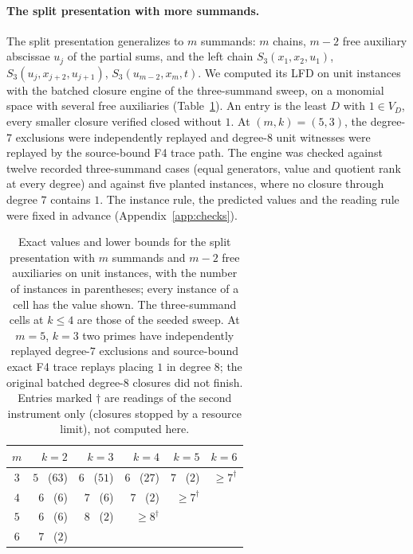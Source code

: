 \documentclass[11pt]{article}
\theoremstyle{definition}\newtheorem{definition}[theorem]{Definition}
\theoremstyle{remark}\newtheorem{remark}[theorem]{Remark}
\begin{document}
\paragraph{The split presentation with more summands.}
The split presentation generalizes to $m$ summands: $m$ chains, $m-2$ free
auxiliary abscissae $u_j$ of the partial sums, and the left chain
$S_3(x_1,x_2,u_1)$, $S_3(u_j,x_{j+2},u_{j+1})$, $S_3(u_{m-2},x_m,t)$. We
computed its LFD on unit instances with the batched closure engine of
the three-summand sweep, on a monomial space with several free auxiliaries
(Table~\ref{tab:splitm}). An entry is the least $D$ with $1\in V_D$, every
smaller closure verified closed without $1$. At $(m,k)=(5,3)$, the
degree-$7$ exclusions were independently replayed and degree-$8$ unit
witnesses were replayed by the source-bound F4 trace path. The engine was checked against
twelve recorded three-summand cases (equal generators, value and quotient
rank at every degree) and against five planted instances, where no closure
through degree $7$ contains $1$. The instance rule, the predicted values and
the reading rule were fixed in advance (Appendix~\ref{app:checks}).

\begin{table}[!ht]
\centering\small
\begin{tabular}{crrrrr}
\toprule
$m$ & $k=2$ & $k=3$ & $k=4$ & $k=5$ & $k=6$\\
\midrule
$3$ & $5$ \ ($63$) & $6$ \ ($51$) & $6$ \ ($27$) & $7$ \ ($2$) & $\ge7^{\dagger}$\\
$4$ & $6$ \ ($6$) & $7$ \ ($6$) & $7$ \ ($2$) & $\ge7^{\dagger}$ & \\
$5$ & $6$ \ ($6$) & $8$ \ ($2$) & $\ge8^{\dagger}$ & & \\
$6$ & $7$ \ ($2$) & & & & \\
\bottomrule
\end{tabular}
\caption{Exact values and lower bounds for the split presentation with $m$ summands
and $m-2$ free auxiliaries on unit instances, with the number of instances
in parentheses; every instance of a cell has the value shown. The
three-summand cells at $k\le4$ are those of the seeded sweep. At $m=5$,
$k=3$ two primes have independently replayed degree-$7$ exclusions and
source-bound exact F4 trace replays placing $1$ in degree $8$; the original
batched degree-$8$ closures did not finish. Entries marked $\dagger$ are readings of the
second instrument only (closures stopped by a resource limit), not computed
here.}
\label{tab:splitm}
\end{table}
\end{document}
